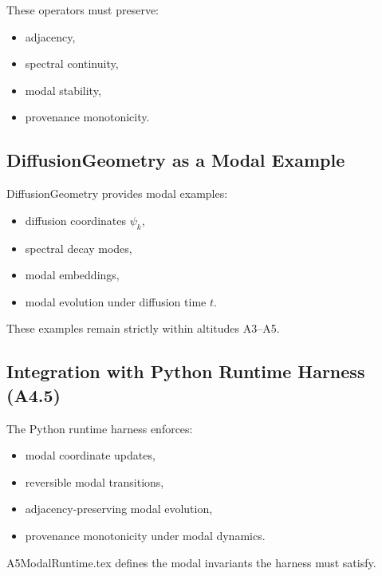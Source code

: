 These operators must preserve:
\begin{itemize}
  \item adjacency,
  \item spectral continuity,
  \item modal stability,
  \item provenance monotonicity.
\end{itemize}

\subsection{DiffusionGeometry as a Modal Example}

DiffusionGeometry provides modal examples:
\begin{itemize}
  \item diffusion coordinates $\psi_k$,
  \item spectral decay modes,
  \item modal embeddings,
  \item modal evolution under diffusion time $t$.
\end{itemize}

These examples remain strictly within altitudes A3–A5.

\subsection{Integration with Python Runtime Harness (A4.5)}

The Python runtime harness enforces:
\begin{itemize}
  \item modal coordinate updates,
  \item reversible modal transitions,
  \item adjacency-preserving modal evolution,
  \item provenance monotonicity under modal dynamics.
\end{itemize}

A5ModalRuntime.tex defines the modal invariants the harness must satisfy.

